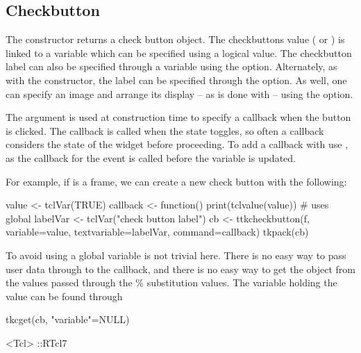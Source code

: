 \subsection{Checkbutton}
\label{sec:tcltk:checkboxes}

The  constructor returns a check button
object. The checkbuttons value ( or ) is linked
to a \TCL\/ variable which can be specified using a logical value.
The checkbutton label can also be specified through a \TCL\/ variable
using the  option.  Alternately,
as with the  constructor, the label can be specified
through the  option. As well, one can
specify an image and arrange its display -- as is done with
 -- using the 
option.

The  argument is used at construction
time to specify a callback when the button is clicked. The callback is
called when the state toggles, so often a callback considers the state
of the widget before proceeding.  To add a callback with
 use , as the callback
for the event  is called before the variable is
updated.

For example, if  is a frame, we can create a new check button
with the following:

\begin{Schunk}
\begin{Sinput}
 value <- tclVar(TRUE)
 callback <- function() print(tclvalue(value))   # uses global
 labelVar <- tclVar("check button label")
 cb <- ttkcheckbutton(f, variable=value, 
                      textvariable=labelVar, command=callback)
 tkpack(cb)
\end{Sinput}
\end{Schunk}

To avoid using a global variable is not trivial here. There is no easy
way to pass user data through to the callback, and there is no easy
way to get the \R\/ object from the values passed through the \%
substitution values. The variable holding the value can be found
through
\begin{Schunk}
\begin{Sinput}
 tkcget(cb, "variable"=NULL)
\end{Sinput}
\begin{Soutput}
<Tcl> ::RTcl7 
\end{Soutput}
\end{Schunk}

